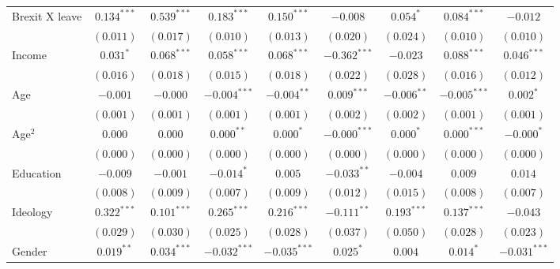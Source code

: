 \documentclass[12pt, letter]{article}
\begin{document}
\begin{table}
\begin{center}
{\begin{tabular}{l c c c c c c c c }
Brexit X leave                   & $0.134^{***}$  & $0.539^{***}$  & $0.183^{***}$  & $0.150^{***}$  & $-0.008$       & $0.054^{*}$    & $0.084^{***}$  & $-0.012$       \\
                                 & $(0.011)$      & $(0.017)$      & $(0.010)$      & $(0.013)$      & $(0.020)$      & $(0.024)$      & $(0.010)$      & $(0.010)$      \\
Income                           & $0.031^{*}$    & $0.068^{***}$  & $0.058^{***}$  & $0.068^{***}$  & $-0.362^{***}$ & $-0.023$       & $0.088^{***}$  & $0.046^{***}$  \\
                                 & $(0.016)$      & $(0.018)$      & $(0.015)$      & $(0.018)$      & $(0.022)$      & $(0.028)$      & $(0.016)$      & $(0.012)$      \\
Age                              & $-0.001$       & $-0.000$       & $-0.004^{***}$ & $-0.004^{**}$  & $0.009^{***}$  & $-0.006^{**}$  & $-0.005^{***}$ & $0.002^{*}$    \\
                                 & $(0.001)$      & $(0.001)$      & $(0.001)$      & $(0.001)$      & $(0.002)$      & $(0.002)$      & $(0.001)$      & $(0.001)$      \\
Age$^2$                            & $0.000$        & $0.000$        & $0.000^{**}$   & $0.000^{*}$    & $-0.000^{***}$ & $0.000^{*}$    & $0.000^{***}$  & $-0.000^{*}$   \\
                                 & $(0.000)$      & $(0.000)$      & $(0.000)$      & $(0.000)$      & $(0.000)$      & $(0.000)$      & $(0.000)$      & $(0.000)$      \\
Education                        & $-0.009$       & $-0.001$       & $-0.014^{*}$   & $0.005$        & $-0.033^{**}$  & $-0.004$       & $0.009$        & $0.014$        \\
                                 & $(0.008)$      & $(0.009)$      & $(0.007)$      & $(0.009)$      & $(0.012)$      & $(0.015)$      & $(0.008)$      & $(0.007)$      \\
Ideology                         & $0.322^{***}$  & $0.101^{***}$  & $0.265^{***}$  & $0.216^{***}$  & $-0.111^{**}$  & $0.193^{***}$  & $0.137^{***}$  & $-0.043$       \\
                                 & $(0.029)$      & $(0.030)$      & $(0.025)$      & $(0.028)$      & $(0.037)$      & $(0.050)$      & $(0.028)$      & $(0.023)$      \\
Gender                           & $0.019^{**}$   & $0.034^{***}$  & $-0.032^{***}$ & $-0.035^{***}$ & $0.025^{*}$    & $0.004$        & $0.014^{*}$    & $-0.031^{***}$ \\

\end{tabular}}
\end{center}
\end{table}
\end{document}
